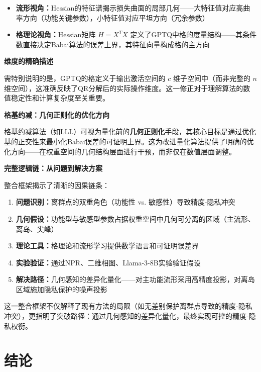 \documentclass[letterpaper,twocolumn,10pt]{article}
\begin{document}
\begin{itemize}
\item \textbf{流形视角：}Hessian的特征谱揭示损失曲面的局部几何——大特征值对应高曲率方向（功能关键参数），小特征值对应平坦方向（冗余参数）

\item \textbf{格理论视角：}Hessian矩阵 $H = X^T X$ 定义了GPTQ中格的度量结构——其条件数直接决定Babai算法的误差上界，其特征向量构成格的主方向
\end{itemize}

\textbf{维度的精确描述}

需特别说明的是，GPTQ的格定义于输出激活空间的 $c$ 维子空间中（而非完整的 $n$ 维空间），这准确反映了QR分解后的实际操作维度。这一修正对于理解算法的数值稳定性和计算复杂度至关重要。

\textbf{格基约减：几何正则化的优化方向}

格基约减算法（如LLL）可视为量化前的\textbf{几何正则化}手段，其核心目标是通过优化基的正交性来最小化Babai误差的可证明上界。这为改进量化算法提供了明确的优化方向——在权重空间的几何结构层面进行干预，而非仅在数值层面调整。

\textbf{完整逻辑链：从问题到解决方案}

整合框架揭示了清晰的因果链条：

\begin{enumerate}
\item \textbf{问题识别：}离群点的双重角色（功能性 vs. 敏感性）导致精度-隐私冲突
\item \textbf{几何假设：}功能型与敏感型参数占据权重空间中几何可分离的区域（主流形、离岛、尖峰）
\item \textbf{理论工具：}格理论和流形学习提供数学语言和可证明误差界
\item \textbf{实验验证：}通过NPR、二维相图、Llama-3-8B实验验证假设
\item \textbf{解决路径：}几何感知的差异化量化——对主功能流形采用高精度投影，对离岛区域施加隐私保护的噪声投影
\end{enumerate}

这一整合框架不仅解释了现有方法的局限（如无差别保护离群点导致的精度-隐私冲突），更指明了突破路径：通过几何感知的差异化量化，最终实现可控的精度-隐私权衡。

\section{结论}
\end{document}
